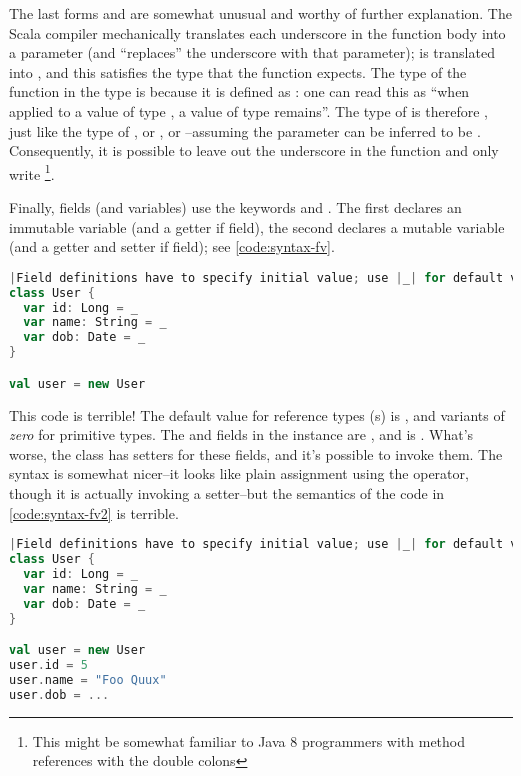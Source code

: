 \documentclass[10 pt]{article}
\begin{document}
The last forms  and  are somewhat unusual and worthy of further explanation. The Scala compiler mechanically translates each underscore in the function body into a parameter (and ``replaces'' the underscore with that parameter);  is translated into , and this satisfies the type that the  function expects. The type of the function \pcode{*} in the  type is  because it is defined as : one can read this as ``when applied to a value of type , a value of type  remains''. The type of  is therefore , just like the type of , or , or --assuming the parameter can be inferred to be . Consequently, it is possible to leave out the underscore in the  function and only write \footnote{This might be somewhat familiar to Java 8 programmers with method references with the double colons}.

Finally, fields (and variables) use the keywords  and . The first declares an immutable variable (and a getter if field), the second declares a mutable variable (and a getter and setter if field); see \autoref{code:syntax-fv}.

\begin{lstlisting}[caption={Fields \& variables}, label={code:syntax-fv}, language=Scala, escapechar=|]
|Field definitions have to specify initial value; use |_| for default value.|
class User {
  var id: Long = _
  var name: String = _
  var dob: Date = _
}

val user = new User
\end{lstlisting}

This code is terrible! The default value for reference types (s) is , and variants of \emph{zero} for primitive types. The  and  fields in the  instance are , and  is . What's worse, the class has setters for these fields, and it's possible to invoke them. The syntax is somewhat nicer--it looks like plain assignment using the \pcode{=} operator, though it is actually invoking a setter--but the semantics of the code in \autoref{code:syntax-fv2} is terrible.

\begin{lstlisting}[caption={Fields \& variables II}, label={code:syntax-fv2}, language=Scala, escapechar=|]
|Field definitions have to specify initial value; use |_| for default value.|
class User {
  var id: Long = _
  var name: String = _
  var dob: Date = _
}

val user = new User
user.id = 5
user.name = "Foo Quux"
user.dob = ...
\end{lstlisting}
\end{document}
